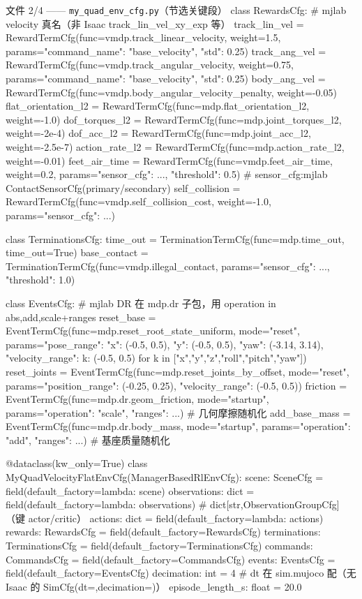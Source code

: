 \begin{codebox}[Python]{文件 2/4 —— \texttt{my\_quad\_env\_cfg.\allowbreak py}（节选关键段）}
class RewardsCfg:                          # mjlab velocity 真名（非 Isaac track_lin_vel_xy_exp 等）
    track_lin_vel = RewardTermCfg(func=vmdp.track_linear_velocity, weight=1.5,
        params={"command_name": "base_velocity", "std": 0.25})
    track_ang_vel = RewardTermCfg(func=vmdp.track_angular_velocity, weight=0.75,
        params={"command_name": "base_velocity", "std": 0.25})
    body_ang_vel = RewardTermCfg(func=vmdp.body_angular_velocity_penalty, weight=-0.05)
    flat_orientation_l2 = RewardTermCfg(func=mdp.flat_orientation_l2, weight=-1.0)
    dof_torques_l2 = RewardTermCfg(func=mdp.joint_torques_l2, weight=-2e-4)
    dof_acc_l2 = RewardTermCfg(func=mdp.joint_acc_l2, weight=-2.5e-7)
    action_rate_l2 = RewardTermCfg(func=mdp.action_rate_l2, weight=-0.01)
    feet_air_time = RewardTermCfg(func=vmdp.feet_air_time, weight=0.2,
        params={"sensor_cfg": ..., "threshold": 0.5})  # sensor_cfg:mjlab ContactSensorCfg(primary/secondary)
    self_collision = RewardTermCfg(func=vmdp.self_collision_cost, weight=-1.0,
        params={"sensor_cfg": ...})

class TerminationsCfg:
    time_out = TerminationTermCfg(func=mdp.time_out, time_out=True)
    base_contact = TerminationTermCfg(func=vmdp.illegal_contact,
        params={"sensor_cfg": ..., "threshold": 1.0})

class EventsCfg:                           # mjlab DR 在 mdp.dr 子包，用 operation in {abs,add,scale}+ranges
    reset_base = EventTermCfg(func=mdp.reset_root_state_uniform, mode="reset",
        params={"pose_range": {"x": (-0.5, 0.5), "y": (-0.5, 0.5), "yaw": (-3.14, 3.14)},
                "velocity_range": {k: (-0.5, 0.5) for k in
                    ["x","y","z","roll","pitch","yaw"]}})
    reset_joints = EventTermCfg(func=mdp.reset_joints_by_offset, mode="reset",
        params={"position_range": (-0.25, 0.25), "velocity_range": (-0.5, 0.5)})
    friction = EventTermCfg(func=mdp.dr.geom_friction, mode="startup",
        params={"operation": "scale", "ranges": {...}})        # 几何摩擦随机化
    add_base_mass = EventTermCfg(func=mdp.dr.body_mass, mode="startup",
        params={"operation": "add", "ranges": {...}})          # 基座质量随机化

@dataclass(kw_only=True)
class MyQuadVelocityFlatEnvCfg(ManagerBasedRlEnvCfg):
    scene: SceneCfg = field(default_factory=lambda: scene)
    observations: dict = field(default_factory=lambda: observations)  # dict[str,ObservationGroupCfg]（键 actor/critic）
    actions: dict = field(default_factory=lambda: actions)
    rewards: RewardsCfg = field(default_factory=RewardsCfg)
    terminations: TerminationsCfg = field(default_factory=TerminationsCfg)
    commands: CommandsCfg = field(default_factory=CommandsCfg)
    events: EventsCfg = field(default_factory=EventsCfg)
    decimation: int = 4                    # dt 在 sim.mujoco 配（无 Isaac 的 SimCfg(dt=,decimation=)）
    episode_length_s: float = 20.0
\end{codebox}

